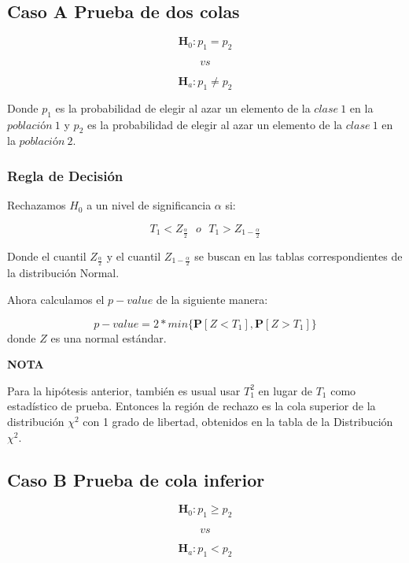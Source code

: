 \documentclass[
  a4paper,
  oneside,
  openany]{book}
\begin{document}
\hypertarget{caso-a-prueba-de-dos-colas-7}{%
\subsection*{Caso A Prueba de dos colas}\label{caso-a-prueba-de-dos-colas-7}}


\[\textbf{H}_0: p_{1} = p_{2}\]

\[vs\]

\[\textbf{H}_a: p_{1} \neq p_{2}\]

Donde \(p_{1}\) es la probabilidad de elegir al azar un elemento de la \(clase\ 1\) en la \(población\ 1\) y \(p_{2}\) es la probabilidad de elegir al azar un elemento de la \(clase\ 1\) en la \(población\ 2\).

\hypertarget{regla-de-decisiuxf3n-21}{%
\subsubsection*{Regla de Decisión}\label{regla-de-decisiuxf3n-21}}


Rechazamos \(H_0\) a un nivel de significancia \(\alpha\) si:

\[T_{1}< Z_\frac{\alpha}{2} \ \ \    o  \ \ \  T_{1} > Z_{1-\frac{\alpha}{2}}\]

Donde el cuantil \(Z_\frac{\alpha}{2}\) y el cuantil \(Z_{1-\frac{\alpha}{2}}\) se buscan en las tablas correspondientes de la distribución Normal.

Ahora calculamos el \(p-value\) de la siguiente manera:

\[p-value=2*min\{ \mathbf{P}[Z<T_{1}],\mathbf{P}[Z>T_{1}]\}\]
donde \(Z\) es una normal estándar.

\textbf{NOTA}

Para la hipótesis anterior, también es usual usar \(T_{1}^2\) en lugar de \(T_{1}\) como estadístico de prueba. Entonces la región de rechazo es la cola superior de la distribución \(\chi^2\) con 1 grado de libertad, obtenidos en la tabla de la Distribución \(\chi^2\).

\hypertarget{caso-b-prueba-de-cola-inferior-6}{%
\subsection*{Caso B Prueba de cola inferior}\label{caso-b-prueba-de-cola-inferior-6}}


\[\textbf{H}_0: p_{1} \geq p_{2}\]

\[vs\]

\[\textbf{H}_a: p_{1} < p_{2}\]
\end{document}
